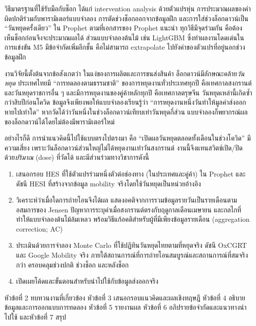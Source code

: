 \documentclass{article}
\theoremstyle{definition}
\begin{document}
วิธีมาตรฐานที่ใช้รับมือกับช็อก ได้แก่ intervention analysis ด้วยตัวแปรหุ่น \citep{box1975intervention} การประมาณผลของค่าผิดปกติร่วมกับพารามิเตอร์แบบจำลอง \citep{chen1993joint} การตัดช่วงช็อกออกจากข้อมูลฝึก และการใส่ช่วงล็อกดาวน์เป็น “วันหยุดครั้งเดียว” ใน Prophet ตามที่เอกสารของ Prophet แนะนำ \citep{prophetshocks} ทุกวิธีมีจุดร่วมกัน คือต้องเห็นช็อกก่อนจึงจะประมาณผลได้ ส่วนแบบจำลองต้นไม้ เช่น LightGBM \citep{ke2017lightgbm} ซึ่งทำผลงานโดดเด่นในการแข่งขัน M5 \citep{makridakis2022m5} มีข้อจำกัดเพิ่มอีกชั้น คือไม่สามารถ extrapolate ไปยังค่าของตัวแปรที่อยู่นอกช่วงข้อมูลฝึก \citep{januschowski2022trees}

งานวิจัยนี้ตั้งต้นจากข้อสังเกตว่า ในแง่ของการผลิตและการขนส่งสินค้า ล็อกดาวน์มีลักษณะคล้าย\emph{วันหยุด} ประเทศไทยมี “การทดลองตามธรรมชาติ” ของการหยุดงานทั่วประเทศทุกปี คือเทศกาลสงกรานต์และวันหยุดราชการอื่น ๆ และมีการหยุดงานของคู่ค้าหลักทุกปี คือเทศกาลตรุษจีน วันหยุดเหล่านี้เกิดซ้ำกว่าสิบปีก่อนโควิด ข้อมูลจึงเพียงพอให้แบบจำลองเรียนรู้ว่า “การหยุดงานหนึ่งวันทำให้มูลค่าส่งออกหายไปเท่าใด” หากวัดได้ว่าวันหนึ่งในช่วงล็อกดาวน์เทียบเท่าวันหยุดกี่ส่วน แบบจำลองก็พยากรณ์ผลของล็อกดาวน์ได้โดยไม่ต้องมีพารามิเตอร์ใหม่

อย่างไรก็ดี การนำแนวคิดนี้ไปใช้แบบตรงไปตรงมา คือ “เปิดผลวันหยุดตลอดทั้งเดือนในช่วงโควิด” มีความเสี่ยง เพราะวันล็อกดาวน์ส่วนใหญ่ไม่ได้หยุดงานเท่าวันสงกรานต์ งานนี้จึงแทนสวิตช์เปิด/ปิดด้วย\emph{ปริมาณ} (dose) ที่วัดได้ และมีส่วนร่วมทางวิชาการดังนี้
\begin{enumerate}
\item เสนอกรอบ HES ที่ใช้ตัวแปรร่วมหนึ่งตัวต่อช่องทาง (ในประเทศและคู่ค้า) ใน Prophet และดัชนี HESI ที่สร้างจากข้อมูล mobility จริงโดยใช้วันหยุดเป็นหน่วยอ้างอิง
\item วิเคราะห์ว่าเมื่อใดการถ่ายโอนจึงได้ผล แสดงอคติจากการรวมข้อมูลรายวันเป็นรายเดือนตามอสมการของ Jensen ปัญหาการระบุค่าเมื่อสงกรานต์ตรงกับฤดูกาลเดือนเมษายน และกลไกที่ทำให้แบบจำลองต้นไม้ล้มเหลว พร้อมวิธีแก้อคติสำหรับผู้ที่มีเพียงข้อมูลรายเดือน (aggregation correction; AC)
\item ประเมินด้วยการจำลอง Monte Carlo ที่ใช้ปฏิทินวันหยุดไทยตามที่หยุดจริง ดัชนี OxCGRT และ Google Mobility จริง ภายใต้สถานการณ์ที่การถ่ายโอนสมบูรณ์และสถานการณ์ที่สมจริงกว่า ครอบคลุมช่วงปกติ ช่วงช็อก และหลังช็อก
\item เปิดเผยโค้ดและขั้นตอนสำหรับนำไปใช้กับข้อมูลส่งออกจริง
\end{enumerate}
หัวข้อที่ 2 ทบทวนงานที่เกี่ยวข้อง หัวข้อที่ 3 เสนอกรอบแนวคิดและผลเชิงทฤษฎี หัวข้อที่ 4 อธิบายข้อมูลและการออกแบบการทดลอง หัวข้อที่ 5 รายงานผล หัวข้อที่ 6 อภิปรายข้อจำกัดและแนวทางนำไปใช้ และหัวข้อที่ 7 สรุป
\end{document}
